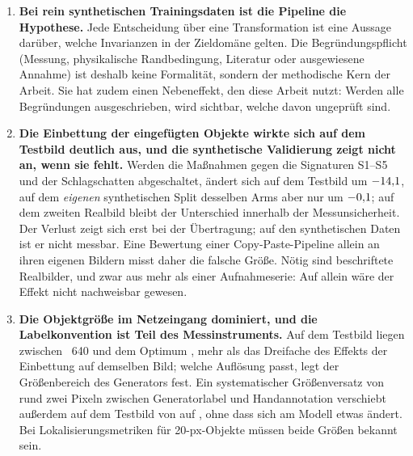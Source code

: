 \begin{enumerate}[itemsep=3pt]
  \item \textbf{Bei rein synthetischen Trainingsdaten ist die Pipeline die
  Hypothese.} Jede Entscheidung über eine Transformation ist eine Aussage
  darüber, welche Invarianzen in der Zieldomäne gelten. Die Begründungspflicht
  (Messung, physikalische Randbedingung, Literatur oder ausgewiesene Annahme)
  ist deshalb keine Formalität, sondern der methodische Kern der Arbeit. Sie
  hat zudem einen Nebeneffekt, den diese Arbeit nutzt: Werden alle
  Begründungen ausgeschrieben, wird sichtbar, welche davon ungeprüft sind.
  \item \textbf{Die Einbettung der eingefügten Objekte wirkte sich auf dem
  Testbild deutlich aus, und die synthetische Validierung zeigt nicht an, wenn
  sie fehlt.} Werden die
  Maßnahmen gegen die Signaturen S1--S5 und der Schlagschatten abgeschaltet,
  ändert sich \mAPfifty{} auf dem Testbild um $-14{,}1$\PP, auf dem
  \emph{eigenen} synthetischen Split desselben Arms aber nur um
  $-0{,}1$\PP; auf dem zweiten Realbild bleibt der Unterschied
  innerhalb der Messunsicherheit. Der Verlust zeigt sich erst bei der
  Übertragung; auf den synthetischen Daten ist er nicht messbar. Eine Bewertung
  einer Copy-Paste-Pipeline allein an ihren eigenen Bildern misst daher die
  falsche Größe.
  Nötig sind beschriftete Realbilder, und zwar aus mehr als einer
  Aufnahmeserie: Auf  allein wäre der Effekt nicht nachweisbar
  gewesen.
  \item \textbf{Die Objektgröße im Netzeingang dominiert, und die
  Labelkonvention ist Teil des Messinstruments.} Auf dem Testbild liegen
  zwischen ~640 und dem Optimum \zswTestGain\PP{} \mAPfifty, mehr
  als das Dreifache des Effekts der Einbettung auf demselben Bild; welche Auflösung
  passt, legt der Größenbereich des Generators fest. Ein systematischer
  Größenversatz von rund zwei Pixeln zwischen Generatorlabel und
  Handannotation verschiebt außerdem \mAPseven{} auf dem Testbild von
  \zsensTestMapSOrig{} auf \zsensTestMapSNeu, ohne dass sich am Modell etwas
  ändert. Bei Lokalisierungsmetriken für 20-px-Objekte müssen beide Größen
  bekannt sein.
\end{enumerate}
